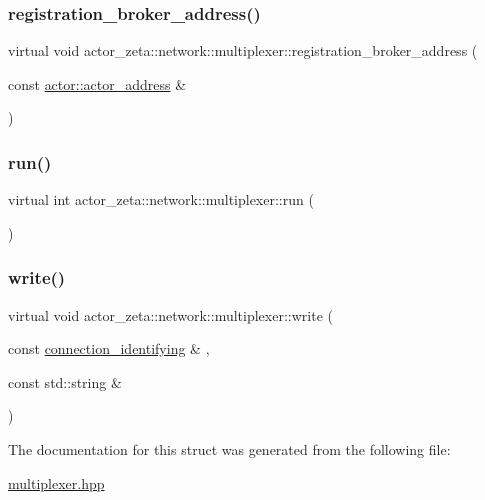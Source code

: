\subsubsection{\texorpdfstring{registration\+\_\+broker\+\_\+address()}{registration\_broker\_address()}}
{\footnotesize\ttfamily virtual void actor\+\_\+zeta\+::network\+::multiplexer\+::registration\+\_\+broker\+\_\+address (\begin{DoxyParamCaption}\item[{const \hyperlink{classactor__zeta_1_1actor_1_1actor__address}{actor\+::actor\+\_\+address} \&}]{ }\end{DoxyParamCaption})\hspace{0.3cm}{\ttfamily [pure virtual]}}

\mbox{\label{structactor__zeta_1_1network_1_1multiplexer_a5147eb14922a4023242b3d37d689cd74}} 
\subsubsection{\texorpdfstring{run()}{run()}}
{\footnotesize\ttfamily virtual int actor\+\_\+zeta\+::network\+::multiplexer\+::run (\begin{DoxyParamCaption}{ }\end{DoxyParamCaption})\hspace{0.3cm}{\ttfamily [pure virtual]}}

\mbox{\label{structactor__zeta_1_1network_1_1multiplexer_afc9b254fa12ef53119889c5002714f36}} 
\subsubsection{\texorpdfstring{write()}{write()}}
{\footnotesize\ttfamily virtual void actor\+\_\+zeta\+::network\+::multiplexer\+::write (\begin{DoxyParamCaption}\item[{const \hyperlink{classactor__zeta_1_1network_1_1connection__identifying}{connection\+\_\+identifying} \&}]{,  }\item[{const std\+::string \&}]{ }\end{DoxyParamCaption})\hspace{0.3cm}{\ttfamily [pure virtual]}}



The documentation for this struct was generated from the following file\+:\begin{DoxyCompactItemize}
\item 
\hyperlink{multiplexer_8hpp}{multiplexer.\+hpp}\end{DoxyCompactItemize}
